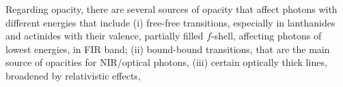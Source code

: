 Regarding opacity, there are several sources of opacity that affect photons with
different energies that include 
(i) free-free transitions, especially in lanthanides and actinides with their 
valence, partially filled $f$-shell, affecting photons of lowest energies, in \ac{FIR} band; 
%
(ii) bound-bound transitions, that are the main source of opacities for 
\ac{NIR}/optical photons, 
(iii) certain optically thick lines, broadened by relativistic effects, 
